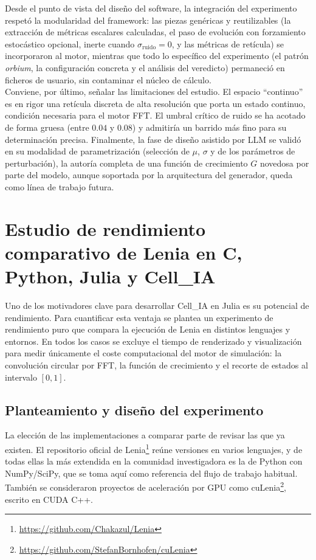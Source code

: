 \documentclass[runningheads]{llncs}
\begin{document}
Desde el punto de vista del diseño del software, la integración del experimento respetó la modularidad del framework: las piezas genéricas y reutilizables (la extracción de métricas escalares calculadas, el paso de evolución con forzamiento estocástico opcional, inerte cuando $\sigma_{\text{ruido}} = 0$,  y las métricas de retícula) se incorporaron al motor, mientras que
todo lo específico del experimento (el patrón \emph{orbium}, la configuración concreta y el análisis del veredicto) permaneció en ficheros de usuario, sin contaminar el núcleo de cálculo.\\

Conviene, por último, señalar las limitaciones del estudio. El espacio ``continuo'' es en rigor
una retícula discreta de alta resolución que porta un estado continuo, condición necesaria para
el motor FFT. El umbral crítico de ruido se ha acotado de forma gruesa (entre $0.04$ y $0.08$) y
admitiría un barrido más fino para su determinación precisa. Finalmente, la fase de diseño asistido
por LLM se validó en su modalidad de parametrización (selección de $\mu$, $\sigma$ y de los
parámetros de perturbación), la autoría completa de una función de crecimiento $G$ novedosa por
parte del modelo, aunque soportada por la arquitectura del generador, queda como línea de trabajo
futura.


\section{Estudio de rendimiento comparativo de Lenia en C, Python, Julia y Cell\_IA}
\label{sec:rendimiento_lenia}
Uno de los motivadores clave para desarrollar Cell\_IA en Julia es su potencial de rendimiento. Para cuantificar esta ventaja se plantea un experimento de rendimiento puro que compara la ejecución de Lenia \cite{ref_lenia} en distintos lenguajes y entornos. En todos los casos se excluye el tiempo de renderizado y visualización para medir únicamente el coste computacional del motor de simulación: la convolución circular por FFT, la función de crecimiento y el recorte de estados al intervalo $[0,1]$.\\

\subsection{Planteamiento y diseño del experimento}
\label{sec:rendimiento_planteamiento}

La elección de las implementaciones a comparar parte de revisar las que ya existen. El repositorio oficial de Lenia\footnote{\url{https://github.com/Chakazul/Lenia}} reúne versiones en varios lenguajes, y de todas ellas la más extendida en la comunidad investigadora es la de Python con NumPy/SciPy, que se toma aquí como referencia del flujo de trabajo habitual. También se consideraron proyectos de aceleración por GPU como cuLenia\footnote{\url{https://github.com/StefanBornhofen/cuLenia}}, escrito en CUDA C++.\\
\end{document}
